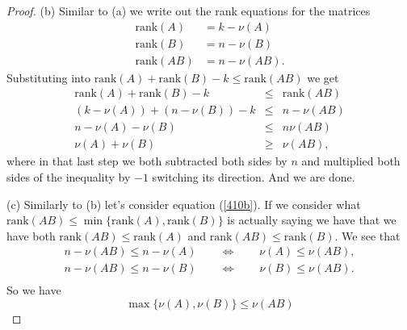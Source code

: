 \documentclass[12pt]{amsart}
\begin{document}
\begin{onehalfspace}
\begin{proof}
            (b) Similar to (a) we write out the rank equations for the matrices
            \begin{equation}
                \begin{aligned}
                    \text{rank}(A) & = k - \nu(A)\\
                    \text{rank}(B) & = n - \nu(B)\\
                    \text{rank}(AB) & = n - \nu(AB).
                \end{aligned}
                \label{410b}
            \end{equation}
            Substituting into $\text{rank}(A) + \text{rank}(B) - k \le \text{rank}(AB)$ we
            get
            \begin{eqnarray*}
                \text{rank}(A) + \text{rank}(B) - k & \le & \text{rank}(AB)\\
                (k-\nu(A)) + (n-\nu(B)) - k & \le & n-\nu(AB) \\
                n - \nu(A) - \nu(B) & \le & n \nu(AB)\\
                \nu(A) + \nu(B) & \ge & \nu(AB),
            \end{eqnarray*}
            where in that last step we both subtracted both sides by $n$ and
            multiplied both sides of the inequality by $-1$ switching its direction.
            And we are done.

            (c) Similarly to (b) let's consider equation (\ref{410b}).
            If we consider what $\text{rank}(AB) \le \min\{\text{rank}(A), \text{rank}(B)\}$ is actually saying
            we have that we have both $\text{rank}(AB) \le \text{rank}(A)$ and $\text{rank}(AB) \le \text{rank}(B)$.
            We see that
            \begin{gather*}
                n - \nu(AB) \le n - \nu(A) \qquad\Longleftrightarrow\qquad \nu(A)\le\nu(AB), \\
                n - \nu(AB) \le n - \nu(B) \qquad\Longleftrightarrow\qquad \nu(B)\le\nu(AB). \\
            \end{gather*}
            So we have
            \begin{displaymath}
                \max\{\nu(A),\nu(B)\}\le\nu(AB)
            \end{displaymath}


\end{proof}
\end{onehalfspace}
\end{document}
